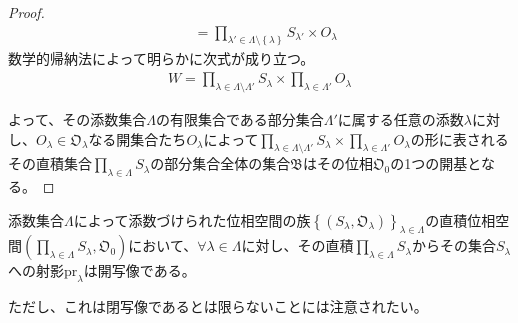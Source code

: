 \documentclass[dvipdfmx]{jsarticle}
\begin{document}
\begin{proof}
\begin{align*}
&= \prod_{\lambda' \in \varLambda \setminus \left\{ \lambda \right\}} S_{\lambda'} \times O_{\lambda}
\end{align*}
数学的帰納法によって明らかに次式が成り立つ。
\begin{align*}
W = \prod_{\lambda \in \varLambda \setminus \varLambda'} S_{\lambda} \times \prod_{\lambda \in \varLambda'} O_{\lambda}
\end{align*}\par
よって、その添数集合$\varLambda$の有限集合である部分集合$\varLambda'$に属する任意の添数$\lambda$に対し、$O_{\lambda} \in \mathfrak{O}_{\lambda}$なる開集合たち$O_{\lambda}$によって$\prod_{\lambda \in \varLambda \setminus \varLambda'} S_{\lambda} \times \prod_{\lambda \in \varLambda'} O_{\lambda}$の形に表されるその直積集合$\prod_{\lambda \in \varLambda} S_{\lambda}$の部分集合全体の集合$\mathfrak{B}$はその位相$\mathfrak{O}_{0}$の1つの開基となる。
\end{proof}
\begin{thm}\label{8.1.4.17}
添数集合$\varLambda$によって添数づけられた位相空間の族$\left\{ \left( S_{\lambda},\mathfrak{O}_{\lambda} \right) \right\}_{\lambda \in \varLambda}$の直積位相空間$\left( \prod_{\lambda \in \varLambda} S_{\lambda},\mathfrak{O}_{0} \right)$において、$\forall\lambda \in \varLambda$に対し、その直積$\prod_{\lambda \in \varLambda} S_{\lambda}$からその集合$S_{\lambda}$への射影${\mathrm{pr}}_{\lambda}$は開写像である。
\end{thm}\par
ただし、これは閉写像であるとは限らないことには注意されたい。
\end{document}
